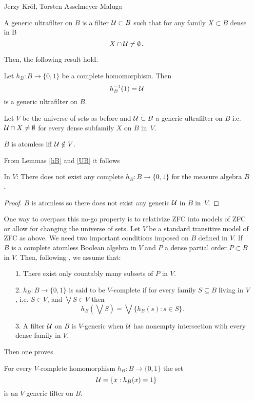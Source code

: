\begin{artengenv2auth}{Jerzy Kr\'ol, Torsten Asselmeyer-Maluga}
\begin{Definition}
A generic ultrafilter on $B$ is a filter ${\cal U}\subset B$ such that for any family $X\subset B$ dense in B
\[X\cap {\cal U}\neq \emptyset \,.  \]
\end{Definition}
Then, the following result hold.
\begin{Lemma}\parencite[p.35]{Solovay1970}\label{hB}
Let $h_B:B\to \{0,1\}$ be a complete homomorphism. Then 
\[h_B^{-1}(1)= {\cal U} \] is a generic ultrafilter on $B$.
\end{Lemma}
Let $V$ be the universe of sets as before and ${\cal U}\subset B$ a generic ultrafilter on $B$ i.e. ${\cal U}\cap X\neq \emptyset$ for every dense subfamily $X$ on $B$ in~$V$.
\begin{Lemma}\parencite[p.7]{Jech1986}\label{UB} $B$ is atomless iff ${\cal U} \notin V$.
\end{Lemma}
From Lemmas \ref{hB} and \ref{UB} it follows
\begin{Lemma}
In $V$: There does not exist any complete $h_B:B\to \{0,1\}$ for the measure algebra $B$.
\end{Lemma}
\begin{proof}$B$ is atomless so there does not exist any generic ${\cal U}$ in $B$ in~$V$.\end{proof}
One way to overpass this no-go property is to relativize ZFC into models of ZFC or allow for changing the universe of sets. Let $V$ be a standard transitive model of ZFC as above. We need two important conditions imposed on $B$ defined in $V$. If $B$ is a complete atomless Boolean algebra in $V$ and $P$ a dense partial order $P\subset B$ in $V$. Then, following \parencite{Solovay1970}, we assume that:
\begin{itemize}
    \item[1.] There exist only countably many subsets of $P$ in $V$.
    \item[2.] $h_B:B\to \{0,1\}$ is said to be $V$-complete if for every family $S\subseteq B$ living in $V$, i.e. $S\in V$, and $\bigvee S\in V$ then 
    \[ h_B(\bigvee S)=\bigvee\{h_B(s):s\in S \} .\]
    \item[3.] A filter ${\cal U}$ on $B$ is $V$-generic when ${\cal U}$ has nonempty intersection with every dense family in $V$.  
\end{itemize}
Then one proves
\begin{Lemma}\parencite[p.35]{Solovay1970}
For every $V$-complete homomorphism $h_B:B\to \{0,1\}$ the set 
\begin{equation}\label{hC} {\cal U}=\{x:h_B(x)=1\} \end{equation} is an $V$-generic filter on $B$.


\end{Lemma}
\end{artengenv2auth}
